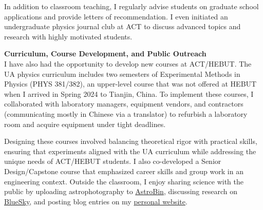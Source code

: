 \documentclass[11pt]{article}
\begin{document}
In addition to classroom teaching, I regularly advise students on graduate school applications and provide letters of recommendation. I even initiated an undergraduate physics journal club at ACT to discuss advanced topics and research with highly motivated students.

{\large\textbf{Curriculum, Course Development, and Public Outreach}}\\
I have also had the opportunity to develop new courses at ACT/HEBUT. The UA physics curriculum includes two semesters of Experimental Methods in Physics (PHYS 381/382), an upper-level course that was not offered at HEBUT when I arrived in Spring 2024 to Tianjin, China. To implement these courses, I collaborated with laboratory managers, equipment vendors, and contractors (communicating mostly in Chinese via a translator) to refurbish a laboratory room and acquire equipment under tight deadlines.

Designing these courses involved balancing theoretical rigor with practical skills, ensuring that experiments aligned with the UA curriculum while addressing the unique needs of ACT/HEBUT students. I also co-developed a Senior Design/Capstone course that emphasized career skills and group work in an engineering context. Outside the classroom, I enjoy sharing science with the public by uploading astrophotography to \href{https://www.astrobin.com/users/djinn/}{AstroBin}, discussing research on \href{https://bsky.app/profile/ajsteinmetz.com}{BlueSky}, and posting blog entries on my \href{https://ajsteinmetz.github.io/}{personal website}.
\end{document}
